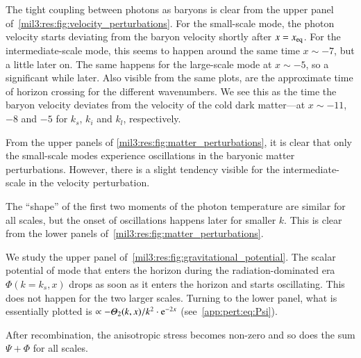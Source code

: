 





The tight coupling between photons as baryons is clear from the upper panel of~\cref{mil3:res:fig:velocity_perturbations}. For the small-scale mode, the photon velocity starts deviating from the baryon velocity shortly after $x=x_\mathrm{eq}$. For the intermediate-scale mode, this seems to happen around the same time $x\sim-7$, but a little later on. The same happens for the large-scale mode at $x\sim -5$, so a significant while later. Also visible from the same plots, are the approximate time of horizon crossing for the different wavenumbers. We see this as the time the baryon velocity deviates from the velocity of the cold dark matter---at $x\sim -11$, $-8$ and $-5$ for $k_s$, $k_i$ and $k_l$, respectively.

From the upper panels of \cref{mil3:res:fig:matter_perturbations}, it is clear that only the small-scale modes experience oscillations in the baryonic matter perturbations. However, there is a slight tendency visible for the intermediate-scale in the velocity perturbation.

The ``shape'' of the first two moments of the photon temperature are similar for all scales, but the onset of oscillations happens later for smaller $k$. This is clear from the lower panels of~\cref{mil3:res:fig:matter_perturbations}.

We study the upper panel of~\cref{mil3:res:fig:gravitational_potential}. The scalar potential of mode that enters the horizon during the radiation-dominated era $\Phi(k\!=\!k_s,x)$ drops as soon as it enters the horizon and starts oscillating. This does not happen for the two larger scales. Turning to the lower panel, what is essentially plotted is $\propto -\Theta_2(k,x)/k^2\cdot \eu[-2x]$ (see~\cref{app:pert:eq:Psi}). 

After recombination, the anisotropic stress becomes non-zero and so does the sum $\Psi + \Phi$ for all scales.


